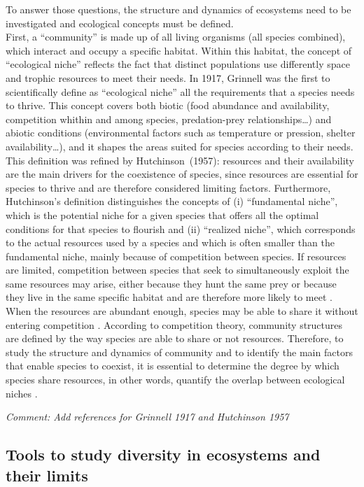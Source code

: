To answer those questions, the structure and dynamics of ecosystems need to be investigated and ecological concepts must be defined.\\ First, a ``community'' is made up of all living organisms (all species combined), which interact and occupy a specific habitat. Within this habitat, the concept of ``ecological niche'' reflects the fact that distinct populations use differently space and trophic resources to meet their needs. In 1917, Grinnell was the first to scientifically define as ``ecological niche'' all the requirements that a species needs to thrive. This concept covers both biotic (food abundance and availability, competition whithin and among species, predation-prey relationships\ldots{}) and abiotic conditions (environmental factors such as temperature or pression, shelter availability\ldots{}), and it shapes the areas suited for species according to their needs. This definition was refined by Hutchinson~(1957): resources and their availability are the main drivers for the coexistence of species, since resources are essential for species to thrive and are therefore considered limiting factors. Furthermore, Hutchinson’s definition distinguishes the concepts of (i) ``fundamental niche'', which is the potential niche for a given species that offers all the optimal conditions for that species to flourish and (ii) ``realized niche'', which corresponds to the actual resources used by a species and which is often smaller than the fundamental niche, mainly because of competition between species. If resources are limited, competition between species that seek to simultaneously exploit the same resources may arise, either because they hunt the same prey or because they live in the same specific habitat and are therefore more likely to meet \citep{blondel1979}. When the resources are abundant enough, species may be able to share it without entering competition \citep{nagelkerke2018}. According to competition theory, community structures are defined by the way species are able to share or not resources. Therefore, to study the structure and dynamics of community and to identify the main factors that enable species to coexist, it is essential to determine the degree by which species share resources, in other words, quantify the overlap between ecological niches \citep{geange2011}.

\emph{Comment: Add references for Grinnell 1917 and Hutchinson 1957}

\subsection{Tools to study diversity in ecosystems and their limits}

